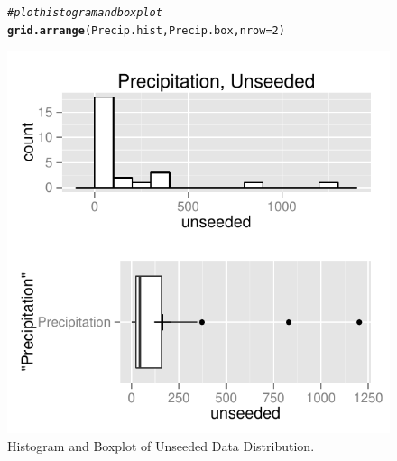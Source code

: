 \documentclass{article}\usepackage[]{graphicx}\usepackage[]{color}
\makeatletter
\def\maxwidth{ %
  \ifdim\Gin@nat@width>\linewidth
    \linewidth
  \else
    \Gin@nat@width
  \fi
}
\newcommand{\hlnum}[1]{\textcolor[rgb]{0.686,0.059,0.569}{#1}}%
\newcommand{\hlcom}[1]{\textcolor[rgb]{0.678,0.584,0.686}{\textit{#1}}}%
\newcommand{\hlstd}[1]{\textcolor[rgb]{0.345,0.345,0.345}{#1}}%
\newcommand{\hlkwc}[1]{\textcolor[rgb]{0.333,0.667,0.333}{#1}}%
\newcommand{\hlkwd}[1]{\textcolor[rgb]{0.737,0.353,0.396}{\textbf{#1}}}%
\newenvironment{kframe}{%
 \def\at@end@of@kframe{}%
 \ifinner\ifhmode%
  \def\at@end@of@kframe{\end{minipage}}%
  \begin{minipage}{\columnwidth}%
 \fi\fi%
 \def\FrameCommand##1{\hskip\@totalleftmargin \hskip-\fboxsep
 \colorbox{shadecolor}{##1}\hskip-\fboxsep
     \hskip-\linewidth \hskip-\@totalleftmargin \hskip\columnwidth}%
 \MakeFramed {\advance\hsize-\width
   \@totalleftmargin\z@ \linewidth\hsize
   \@setminipage}}%
 {\par\unskip\endMakeFramed%
 \at@end@of@kframe}
\newenvironment{knitrout}{}{} %
\makeatother
\begin{document}
\begin{figure}[H]  \begin{center}
\begin{knitrout}
\color{fgcolor}\begin{kframe}
\begin{alltt}
\hlcom{# plot histogram and boxplot}
\hlkwd{grid.arrange}\hlstd{(Precip.hist, Precip.box,} \hlkwc{nrow} \hlstd{=} \hlnum{2}\hlstd{)}
\end{alltt}
\end{kframe}
\includegraphics[width=\maxwidth]{figure/1a_data_unseed_plot} 

\end{knitrout}
\end{center} \caption{Histogram and Boxplot of Unseeded Data Distribution.} \end{figure}
\end{document}
